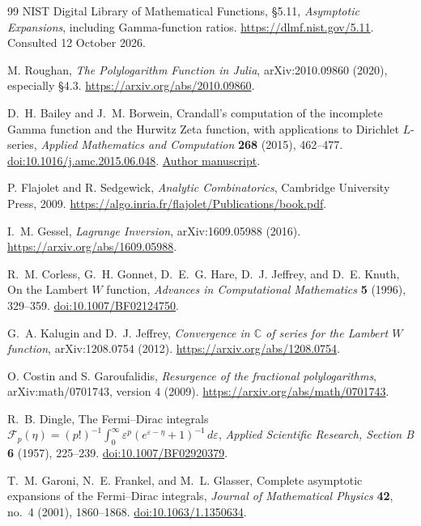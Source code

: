 \documentclass[11pt,a4paper]{article}
\numberwithin{equation}{section}
\theoremstyle{definition}
\theoremstyle{remark}
\newcommand{\C}{\mathbb C}
\begin{document}
\begin{thebibliography}{99}
NIST Digital Library of Mathematical Functions,
\S5.11, \emph{Asymptotic Expansions}, including Gamma-function ratios.
\url{https://dlmf.nist.gov/5.11}.
Consulted 12 October 2026.

M. Roughan,
\emph{The Polylogarithm Function in Julia},
arXiv:2010.09860 (2020), especially \S4.3.
\url{https://arxiv.org/abs/2010.09860}.

D.~H. Bailey and J.~M. Borwein,
Crandall's computation of the incomplete Gamma function and the
Hurwitz Zeta function, with applications to Dirichlet $L$-series,
\emph{Applied Mathematics and Computation}
\textbf{268} (2015), 462--477.
\href{https://doi.org/10.1016/j.amc.2015.06.048}
{doi:10.1016/j.amc.2015.06.048}.
\href{https://www.davidhbailey.com/dhbpapers/lerch.pdf}
{Author manuscript}.

P. Flajolet and R. Sedgewick,
\emph{Analytic Combinatorics},
Cambridge University Press, 2009.
\url{https://algo.inria.fr/flajolet/Publications/book.pdf}.

I.~M. Gessel,
\emph{Lagrange Inversion},
arXiv:1609.05988 (2016).
\url{https://arxiv.org/abs/1609.05988}.

R.~M. Corless, G.~H. Gonnet, D.~E.~G. Hare, D.~J. Jeffrey,
and D.~E. Knuth,
On the Lambert $W$ function,
\emph{Advances in Computational Mathematics}
\textbf{5} (1996), 329--359.
\href{https://doi.org/10.1007/BF02124750}
{doi:10.1007/BF02124750}.

G.~A. Kalugin and D.~J. Jeffrey,
\emph{Convergence in $\C$ of series for the Lambert $W$ function},
arXiv:1208.0754 (2012).
\url{https://arxiv.org/abs/1208.0754}.

O. Costin and S. Garoufalidis,
\emph{Resurgence of the fractional polylogarithms},
arXiv:math/0701743, version 4 (2009).
\url{https://arxiv.org/abs/math/0701743}.

R.~B. Dingle,
The Fermi--Dirac integrals
$\mathcal F_p(\eta)
=(p!)^{-1}\int_0^\infty
\varepsilon^p(e^{\varepsilon-\eta}+1)^{-1}\,d\varepsilon$,
\emph{Applied Scientific Research, Section B}
\textbf{6} (1957), 225--239.
\href{https://doi.org/10.1007/BF02920379}
{doi:10.1007/BF02920379}.

T.~M. Garoni, N.~E. Frankel, and M.~L. Glasser,
Complete asymptotic expansions of the Fermi--Dirac integrals,
\emph{Journal of Mathematical Physics}
\textbf{42}, no.~4 (2001), 1860--1868.
\href{https://doi.org/10.1063/1.1350634}
{doi:10.1063/1.1350634}.


\end{thebibliography}
\end{document}
